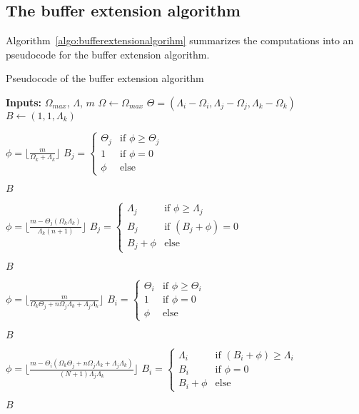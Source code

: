 \documentclass[conference]{IEEEtran}
\begin{document}
\subsection{The buffer extension algorithm}
Algorithm~\ref{algo:bufferextensionalgorihm} summarizes the computations into an
pseudocode for the buffer extension algorithm.

\begin{algorithm}
  \caption{Pseudocode of the buffer extension algorithm}
  \label{algo:bufferextensionalgorihm}
  \begin{algorithmic}[1]
    \STATE \textbf{Inputs:} $\Omega_{max}$, $\Lambda$, $m$
    \STATE $\Omega \leftarrow \Omega_{max}$
    \STATE $\Theta = (\Lambda_i - \Omega_i, \Lambda_j - \Omega_j, \Lambda_k - \Omega_k)$
    \STATE $B \leftarrow (1,1,\Lambda_k)$

    \STATE $\phi = \lfloor \frac{m}{\Omega_k + \Lambda_k} \rfloor$
    \STATE $B_j = \begin{cases}
      \Theta_j & \textrm{if }\phi \geq \Theta_j \\
      1 & \textrm{if }\phi = 0 \\
      \phi & \textrm{else}
    \end{cases}$

      \RETURN $B$
    \ENDIF

    \STATE $\phi = \lfloor \frac{m-\Theta_j(\Omega_k\Lambda_k)}{\Lambda_k(n+1)} \rfloor$
    \STATE $B_j = \begin{cases}
      \Lambda_j & \textrm{if }\phi \geq \Lambda_j \\
      B_j & \textrm{if }(B_j+\phi) = 0 \\
      B_j + \phi & \textrm{else}
    \end{cases}$

      \RETURN $B$
    \ENDIF

    \STATE $\phi = \lfloor \frac{m}{\Omega_k\Theta_j + n\Omega_j\Lambda_k + \Lambda_j\Lambda_k} \rfloor$
    \STATE $B_i = \begin{cases}
      \Theta_i & \textrm{if }\phi \geq \Theta_i \\
      1 & \textrm{if }\phi = 0 \\
      \phi & \textrm{else}
    \end{cases}$

      \RETURN $B$
    \ENDIF

    \STATE $\phi = \lfloor \frac{m-\Theta_i(\Omega_k\Theta_j + n\Omega_j\Lambda_k + \Lambda_j\Lambda_k)}{(N+1)\Lambda_j\Lambda_k} \rfloor$
    \STATE $B_i = \begin{cases}
      \Lambda_i & \textrm{if }(B_i+\phi) \geq \Lambda_i \\
      B_i & \textrm{if }\phi = 0 \\
      B_i+\phi & \textrm{else}
    \end{cases}$

    \RETURN $B$

  \end{algorithmic}
\end{algorithm}
\end{document}
